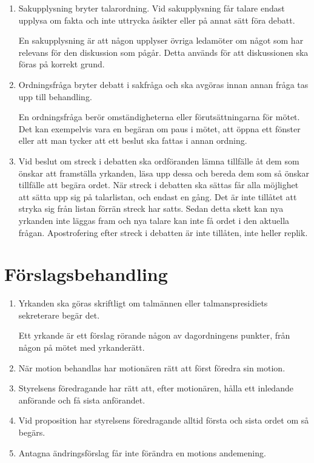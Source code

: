 \documentclass{dvd}
\begin{document}
	\begin{enumerate}[label=\arabic* §, ref=\arabic*]
		\item Sakupplysning bryter talarordning.
		Vid sakupplysning får talare endast upplysa om fakta och inte uttrycka åsikter eller på annat sätt föra debatt.

		En sakupplysning är att någon upplyser övriga ledamöter om något som har relevans för den diskussion som pågår.
		Detta används för att diskussionen ska föras på korrekt grund.

		\item Ordningsfråga bryter debatt i sakfråga och ska avgöras innan annan fråga tas upp till behandling.

		En ordningsfråga berör omständigheterna eller förutsättningarna för mötet.
		Det kan exempelvis vara en begäran om paus i mötet, att öppna ett fönster eller att man tycker att ett beslut ska fattas i annan ordning.

		\item  Vid beslut om streck i debatten ska ordföranden lämna tillfälle åt dem som önskar att framställa yrkanden, läsa upp dessa och bereda dem som så önskar tillfälle att begära ordet.
		När streck i debatten ska sättas får alla möjlighet att sätta upp sig på talarlistan, och endast en gång.
		Det är inte tillåtet att stryka sig från listan förrän streck har satts.
		Sedan detta skett kan nya yrkanden inte läggas fram och nya talare kan inte få ordet i den aktuella frågan.
		Apostrofering efter streck i debatten är inte tillåten, inte heller replik.
	\end{enumerate}

	\section{Förslagsbehandling}

	\begin{enumerate}[label=\arabic* §, ref=\arabic*]
		\item Yrkanden ska göras skriftligt om talmännen eller talmanspresidiets sekreterare begär det.

		Ett yrkande är ett förslag rörande någon av dagordningens punkter, från någon på mötet med yrkanderätt.

		\item När motion behandlas har motionären rätt att först föredra sin motion.

		\item Styrelsens föredragande har rätt att, efter motionären, hålla ett inledande anförande och få sista anförandet.

		\item Vid proposition har styrelsens föredragande alltid första och sista ordet om så begärs.

		\item Antagna ändringsförslag får inte förändra en motions andemening.
	\end{enumerate}
\end{document}
